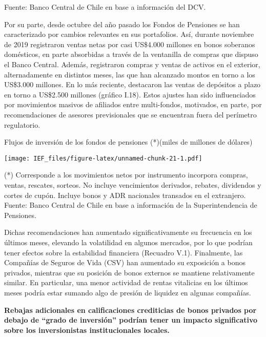 \documentclass[
]{book}
\begin{document}
Fuente: Banco Central de Chile en base a información del DCV.

Por su parte, desde octubre del año pasado los Fondos de Pensiones se
han caracterizado por cambios relevantes en sus portafolios. Así, durante
noviembre de 2019 registraron ventas netas por casi US\$4.000 millones en
bonos soberanos domésticos, en parte absorbidas a través de la ventanilla
de compras que dispuso el Banco Central. Además, registraron compras y
ventas de activos en el exterior, alternadamente en distintos meses, las que
han alcanzado montos en torno a los US\$3.000 millones. En lo más reciente,
destacaron las ventas de depósitos a plazo en torno a US\$2.500 millones
(gráfico I.18). Estos ajustes han sido influenciados por movimientos masivos
de afiliados entre multi-fondos, motivados, en parte, por recomendaciones
de asesores previsionales que se encuentran fuera del perímetro regulatorio.

Flujos de inversión de los fondos de pensiones (*)(miles de millones de dólares)

\texttt{[image: IEF\_files/figure-latex/unnamed-chunk-21-1.pdf]}

(*) Corresponde a los movimientos netos por instrumento incorpora compras, ventas, rescates, sorteos. No incluye vencimientos derivados, rebates, dividendos y cortes de cupón. Incluye bonos y ADR nacionales transados en el extranjero.
Fuente: Banco Central de Chile en base a información de la Superintendencia de Pensiones.

Dichas recomendaciones han aumentado significativamente su frecuencia en
los últimos meses, elevando la volatilidad en algunos mercados, por lo que
podrían tener efectos sobre la estabilidad financiera (Recuadro V.1).
Finalmente, las Compañías de Seguros de Vida (CSV) han aumentado su
exposición a bonos privados, mientras que su posición de bonos externos se
mantiene relativamente similar. En particular, una menor actividad de rentas
vitalicias en los últimos meses podría estar sumando algo de presión de liquidez
en algunas compañías.

\textbf{Rebajas adicionales en calificaciones crediticias de bonos privados por debajo de ``grado de inversión'' podrían tener un impacto significativo sobre los inversionistas institucionales locales.}
\end{document}

